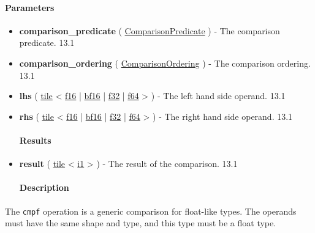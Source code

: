 \documentclass{article}
\begin{document}
\paragraph{Parameters}

\begin{itemize}
\item \textbf{comparison\_predicate} ( \href{https://docs.nvidia.com/cuda/tile-ir/latest/sections/operations.html#op-attribute-cuda-tile-cmpf-comparisonpredicate-attr}{ComparisonPredicate} ) - The comparison predicate. 13.1
\item \textbf{comparison\_ordering} ( \href{https://docs.nvidia.com/cuda/tile-ir/latest/sections/operations.html#op-attribute-cuda-tile-cmpf-comparisonordering-attr}{ComparisonOrdering} ) - The comparison ordering. 13.1
\item \textbf{lhs} ( \href{https://docs.nvidia.com/cuda/tile-ir/latest/sections/types.html#type-tile}{tile} < \href{https://docs.nvidia.com/cuda/tile-ir/latest/sections/types.html#subsection-element-types}{f16} | \href{https://docs.nvidia.com/cuda/tile-ir/latest/sections/types.html#subsection-element-types}{bf16} | \href{https://docs.nvidia.com/cuda/tile-ir/latest/sections/types.html#subsection-element-types}{f32} | \href{https://docs.nvidia.com/cuda/tile-ir/latest/sections/types.html#subsection-element-types}{f64} > ) - The left hand side operand. 13.1
\item \textbf{rhs} ( \href{https://docs.nvidia.com/cuda/tile-ir/latest/sections/types.html#type-tile}{tile} < \href{https://docs.nvidia.com/cuda/tile-ir/latest/sections/types.html#subsection-element-types}{f16} | \href{https://docs.nvidia.com/cuda/tile-ir/latest/sections/types.html#subsection-element-types}{bf16} | \href{https://docs.nvidia.com/cuda/tile-ir/latest/sections/types.html#subsection-element-types}{f32} | \href{https://docs.nvidia.com/cuda/tile-ir/latest/sections/types.html#subsection-element-types}{f64} > ) - The right hand side operand. 13.1


\paragraph{Results}

\item \textbf{result} ( \href{https://docs.nvidia.com/cuda/tile-ir/latest/sections/types.html#type-tile}{tile} < \href{https://docs.nvidia.com/cuda/tile-ir/latest/sections/types.html#subsection-element-types}{i1} > ) - The result of the comparison. 13.1


\paragraph{Description}

\end{itemize}
The \texttt{cmpf} operation is a generic comparison for float-like types. The operands must have the same shape and type, and this type must be a float type.
\end{document}
